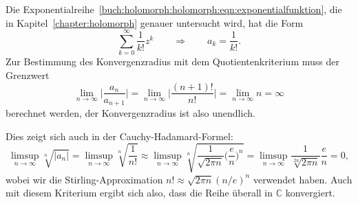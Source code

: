 \begin{beispiel}
\label{buch:komplex:funktionen:bsp:exponentialfunktion}
Die Exponentialreihe~\eqref{buch:holomorph:holomorph:eqn:exponentialfunktion},
%
die in Kapitel~\ref{chapter:holomorph} genauer untersucht wird,
hat die Form
\[
\sum_{k=0}^\infty
\frac{1}{k!} z^k
\qquad\Rightarrow\qquad
a_k = \frac{1}{k!}.
\]
Zur Bestimmung des Konvergenzradius mit
dem Quotientenkriterium muss der Grenzwert
\[
\lim_{n\to\infty}
\biggl|
\frac{a_n}{a_{n+1}}
\biggr|
=
\lim_{n\to\infty}
\biggl|
\frac{(n+1)!}{n!}
\biggr|
=
\lim_{n\to\infty} n
=
\infty
\]
berechnet werden,
der Konvergenzradius ist also unendlich.

Dies zeigt sich auch in der Cauchy-Hadamard-Formel:
%
\[
\limsup_{n\to\infty}
\!\sqrt[n]{|a_n|}
=
\limsup_{n\to\infty}
\!\sqrt[n]{\frac1{n!}}
\approx
\limsup_{n\to\infty}
\!\sqrt[n]{\frac{1}{\!\sqrt{2\pi n}}\biggl(\frac{e}{n}\biggr)^n}
=
\limsup_{n\to\infty}
\frac{1}{\!\sqrt[2n]{2\pi n}}
\frac{e}{n}
=
0,
\]
wobei wir die Stirling-Approximation $n!\approx\!\sqrt{2\pi n}(n/e)^n$
%
%
verwendet haben.
Auch mit diesem Kriterium ergibt sich also, dass die Reihe überall
in $\mathbb{C}$ konvergiert.
\end{beispiel}

